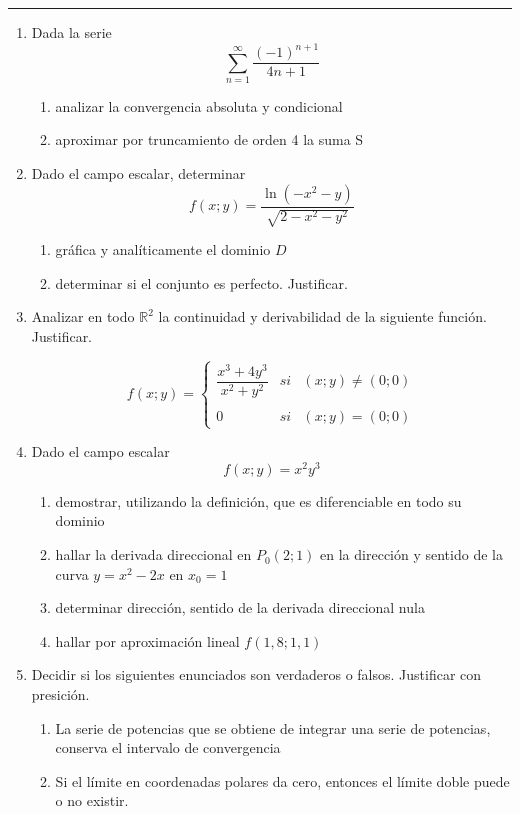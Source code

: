 \documentclass[9pt,a4paper]{extarticle}
\begin{document}
\hrule
{}
\begin{enumerate}
     \item Dada la serie 
    \[
    \sum_{n=1}^{\infty}\dfrac{(-1)^{n+1}}{4n+1}
    \]
    \begin{enumerate}
    \item analizar la convergencia absoluta y condicional
    \item aproximar por truncamiento de orden 4 la suma S
    \end{enumerate}
    
    
    \item Dado el campo escalar, determinar
    \[
    f(x;y)= \dfrac{\ln{(-x^2-y)}}{\sqrt{2-x^2-y^2}}
    \]
    
    \begin{enumerate}
        \item gráfica y analíticamente el dominio $D$
        \item determinar si el conjunto es perfecto. Justificar.
    \end{enumerate}
    
    
   \item Analizar en todo $ {\mathbb{R}}^2 $ la continuidad y derivabilidad de la siguiente función. Justificar.
   
    \[
    f(x;y)= \left\{ \begin{array}{lcc}
             \dfrac{x^3 + 4y^3}{x^2 + y^2} &   si  & (x;y) \neq (0;0) \\
             \\ 0 &  si & (x;y) = (0;0)
             \end{array}
   \right.
    \]
    
    \item Dado el campo escalar \[ f(x;y)=x^2y^3 \] 
    \begin{enumerate}
         \item demostrar, utilizando la definición, que es diferenciable en todo su dominio
         \item hallar la derivada direccional en $P_0 (2;1)$ en la dirección y sentido de la curva $ y=x^2-2x$ en $x_0=1$
         \item determinar dirección, sentido de la derivada direccional nula
         \item hallar por aproximación lineal $f(1,8;1,1)$
    \end{enumerate}
    
    
    \item Decidir si los siguientes enunciados son verdaderos o falsos. Justificar con presición.
    \begin{enumerate}
         \item La serie de potencias que se obtiene de integrar una serie de potencias, conserva el intervalo de convergencia
         \item Si el límite en coordenadas polares da cero, entonces el límite doble puede o no existir.
    \end{enumerate}
\end{enumerate}
\end{document}
